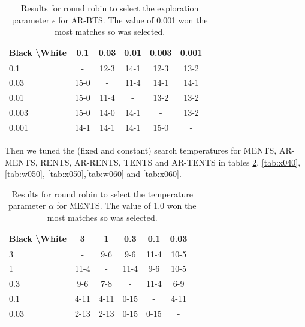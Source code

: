     \begin{table}[]
    \centering
        \begin{tabular}{l|cccccc}
            \textbf{Black \textbackslash White}     & 0.1  & 0.03   & 0.01   & 0.003    & 0.001    \\ 
            \hline
                                    0.1            & - & 12-3 & 14-1 & 12-3 & 13-2   		\\
                                    0.03            & 15-0 & - & 11-4 & 14-1 & 14-1   		\\
                                    0.01          & 15-0 & 11-4 & - & 13-2 & 13-2   		\\
                                    0.003          & 15-0 & 14-0 & 14-1 & - & 13-2   		\\
                                    0.001         & 14-1 & 14-1 & 14-1 & 15-0 &   -   	\\    
        \end{tabular}
        \caption{Results for round robin to select the exploration parameter $\epsilon$ for AR-BTS. The value of 0.001 won the most matches so was selected. \label{tab:x030}}
    \end{table}
    
    
    
    
    
    
    
    
    
    Then we tuned the (fixed and constant) search temperatures for MENTS, AR-MENTS, RENTS, AR-RENTS, TENTS and AR-TENTS in tables \ref{tab:w040}, \ref{tab:x040},\ref{tab:w050}, \ref{tab:x050},\ref{tab:w060} and \ref{tab:x060}.
    
    
    
    
    \begin{table}[]
    \centering
        \begin{tabular}{l|cccccc}
            \textbf{Black \textbackslash White}     & 3  & 1   & 0.3   & 0.1    & 0.03    \\ 
            \hline
                                    3            & -     	&   	9-6	&  9-6 		&   	11-4	&  10-5 		\\
                                    1            & 11-4  		& -     	&  11-4		&  9-6 		& 10-5  		\\
                                    0.3          &  9-6  	&  7-8  	&   -   &  11-4 		&  6-9 		\\
                                    0.1          &  4-11 		&   4-11		&   0-15		& -     	&  4-11 		\\
                                    0.03         &   	2-13	&  2-13 		&  0-15 		&   0-15		&   -   	\\      
        \end{tabular}
        \caption{Results for round robin to select the temperature parameter $\alpha$ for MENTS. The value of 1.0 won the most matches so was selected. \label{tab:w040}}
    \end{table}
    
